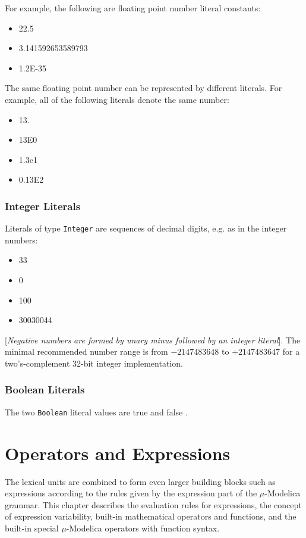 \documentclass[11pt,a4paper,notitlepage]{report}
\begin{document}
For example, the following are floating point number literal constants:
\begin{itemize}
\item 22.5
\item 3.141592653589793
\item 1.2E-35 
\end{itemize}

The same floating point number can be represented by different literals. For example, all of the following literals denote the same number:

\begin{itemize}
\item 13.
\item 13E0
\item 1.3e1
\item 0.13E2
\end{itemize}

\subsection{Integer Literals}

Literals of type \verb"Integer" are sequences of decimal digits, e.g. as in the integer numbers:

\begin{itemize}
\item 33
\item 0
\item 100
\item 30030044
\end{itemize}

[\emph{Negative numbers are formed by unary minus followed by an integer literal}]. The minimal recommended number range is from $-2147483648$ to $+2147483647$ for a two’s-complement 32-bit integer implementation.

\subsection{Boolean Literals}

The two \verb"Boolean" literal values are true and false .

\chapter{Operators and Expressions}\label{ch:operators}

The lexical units are combined to form even larger building blocks such as expressions according to the rules given by the expression part of the $\mu$-Modelica grammar. This chapter describes the evaluation rules for expressions, the concept of expression variability, built-in
mathematical operators and functions, and the built-in special $\mu$-Modelica operators with function syntax.
\end{document}
